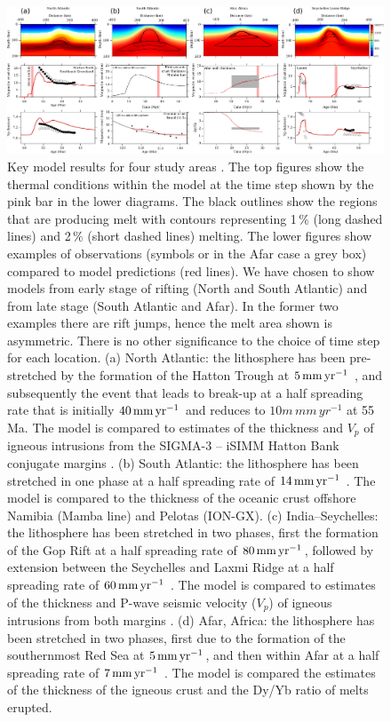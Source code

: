 \begin{figure}
\centering
\includegraphics[width=22.5cm]{./figures/ch2-mantle2.pdf}
\caption{Key model results for four study areas \citep[see][]{armitage-2018}. The top figures show the thermal conditions within the model at the time step shown by the pink bar in the lower diagrams. The black outlines show the regions that are producing melt with contours representing 1\,\% (long dashed lines) and 2\,\% (short dashed lines) melting. The lower figures show examples of observations (symbols or in the Afar case a grey box) compared to model predictions (red lines). We have chosen to show models from early stage of rifting (North and South Atlantic) and from late stage (South Atlantic and Afar). In the former two examples there are rift jumps, hence the melt area shown is asymmetric. There is no other significance to the choice of time step for each location. (a) North Atlantic: the lithosphere has been pre-stretched by the formation of the Hatton Trough at $5\rm\,mm\,yr^{-1}$ \citep[see][]{armitage-etal-2009}, and subsequently the event that leads to break-up at a half spreading rate that is initially $40\rm\,mm\,yr^{-1}$ and reduces to $10
m\,mm\,yr^{-1}$ at 55\,Ma. The model is compared to estimates of the thickness and $V_{p}$ of igneous intrusions from the SIGMA-3 -- iSIMM Hatton Bank conjugate margins \citep{hopper-etal-2003,white-etal-2008}. (b) South Atlantic: the lithosphere has been stretched in one phase at a half spreading rate of $14\rm\,mm\,yr^{-1}$ \citep[see][]{taposeea-etal-2016}. The model is compared to the thickness of the oceanic crust offshore Namibia (Mamba line) and Pelotas (ION-GX). (c) India–Seychelles: the lithosphere has been stretched in two phases, first the formation of the Gop Rift at a half spreading rate of $80\rm\,mm\,yr^{-1}$, followed by extension between the Seychelles and Laxmi Ridge at a half spreading rate of $60\rm\,mm\,yr^{-1}$ \citep[see][]{armitage-etal-g3-2011}. The model is compared to estimates of the thickness and P-wave seismic velocity ($V_{p}$) of igneous intrusions from both margins \citep{collier-etal-2009,minshull-etal-2008}. (d) Afar, Africa: the lithosphere has been stretched in two phases, first due to the formation of the southernmost Red Sea at $5\rm\,mm\,yr^{-1}$, and then within Afar at a half spreading rate of $7\rm\,mm\,yr^{-1}$ \citep[see][]{armitage-etal-2015}. The model is compared the estimates of the thickness of the igneous crust and the Dy/Yb ratio of melts erupted.}
\label{fg:4models}
\end{figure}

